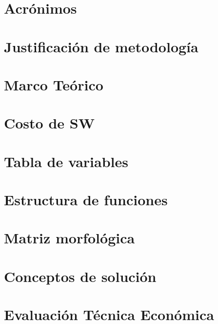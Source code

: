 \appendix
\chapter{Acrónimos}
\label{an:Anexo_A}

\cleardoublepage 
 \chapter{Justificación de metodología}
 \label{an:Anexo_B}

 \cleardoublepage
 \chapter{Marco Teórico}
 \label{an:Anexo_C}
     
 \cleardoublepage
\chapter{Costo de \ac{SW}}
\label{an:Anexo_D}

\cleardoublepage
 \chapter{Tabla de variables}
 \label{an:Anexo_E}

 \cleardoublepage
 \chapter{Estructura de funciones}
 \label{an:Anexo_F}

 \cleardoublepage
 \chapter{Matriz morfológica}
 \label{an:Anexo_G}

 \cleardoublepage

\chapter{Conceptos de solución}
\label{an:Anexo_W}

\cleardoublepage

\chapter{Evaluación Técnica Económica}
\label{an:Anexo_V}

\cleardoublepage

